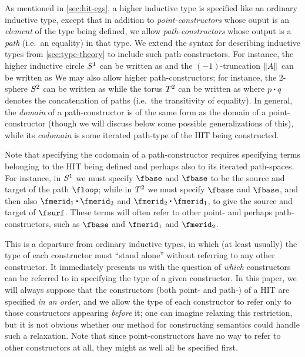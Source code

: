 \documentclass{amsart}
\begin{document}
As mentioned in \cref{sec:hit-egs}, a higher inductive type is specified like an ordinary inductive type, except that in addition to \emph{point-constructors} whose ouput is an \emph{element} of the type being defined, we allow \emph{path-constructors} whose output is a \emph{path} (i.e.\ an equality) in that type.
We extend the syntax for describing inductive types from \cref{sec:type-theory} to include such path-constructors.
For instance, the higher inductive circle $S^1$ can be written as
\indef{\circtype}{
  \fbase : \circtype \OR
  \floop : \id[\circtype]{\fbase}{\fbase}
}
and the $(-1)$-truncation $\mathopen{}\left\Vert A\right\Vert_{}\mathclose{}$ can be written as
We may also allow higher path-constructors; for instance, the 2-sphere $S^{2}$ can be written as
while the torus $T^2$ can be written as
where $p\ct q$ denotes the concatenation of paths (i.e.\ the transitivity of equality).
In general, the \emph{domain} of a path-constructor is of the same form as the domain of a point-constructor (though we will discuss below some possible generalizations of this), while its \emph{codomain} is some iterated path-type of the HIT being constructed.

Note that specifying the codomain of a path-constructor requires specifying terms belonging to the HIT being defined and perhaps also to its iterated path-spaces.
For instance, in $S^1$ we must specify $\fbase$ and $\fbase$ to be the source and target of the path $\floop$; while in $T^2$ we must specify $\fbase$ and $\fbase$, and then also ${\fmerid_1 \ct \fmerid_2}$ and ${\fmerid_2 \ct \fmerid_1}$, to give the source and target of $\fsurf$.
These terms will often refer to other point- and perhaps path-constructors, such as $\fbase$ and $\fmerid_1$ and $\fmerid_2$.

This is a departure from ordinary inductive types, in which (at least usually) the type of each constructor must ``stand alone'' without referring to any other constructor.
It immediately presents us with the question of \emph{which} constructors can be referred to in specifying the type of a given constructor.
In this paper, we will always suppose that the constructors (both point- and path-) of a HIT are specified \emph{in an order}, and we allow the type of each constructor to refer only to those constructors appearing \emph{before} it; one can imagine relaxing this restriction, but it is not obvious whether our method for constructing semantics could handle such a relaxation.
Note that since point-constructors have no way to refer to other constructors at all, they might as well all be specified first.
\end{document}

